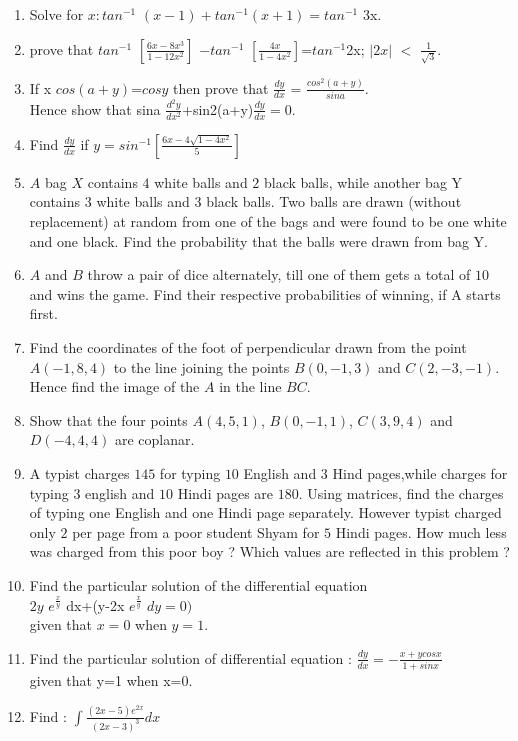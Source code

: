 \documentclass[12pt,-letter paper]{article}
\begin{document}
\begin{enumerate}
\item Solve for $x:tan^{-1}$ $(x-1)+tan^{-1}(x+1)=tan^{-1}$ 3x.
\item prove that $tan^{-1}$ $[\frac{6x-8x^3}{1-12x^2}]$
$-tan^{-1}$ $[\frac{4x}{1-4x^2}]$=$tan^{-1}$2x; $|2x|$ $<$ $\frac{1}{\sqrt{3}}.$
\item If x $cos(a+y)$=$cosy$ then prove that $\frac{dy}{dx}$ = $\frac{cos^2(a+y)}{sina}$. \\
	
Hence show that sina $\frac{d^2y}{dx^2}$+sin2(a+y)$\frac{dy}{dx}=0$.
\item Find $\frac{dy}{dx}$ if $y=sin^{-1}[\frac{6x-4\sqrt{1-4x^2}}{5}]$
\item $A$ bag $X$ contains $4$ white balls and $2$ black balls, while another bag Y contains $3$ white balls and
$3$ black balls. Two balls are drawn (without replacement) at random from one of the bags and were found to be one white and one black. Find the probability that the balls were drawn from bag Y.
\item $A$ and $B$ throw a pair of dice alternately, till one of them gets a total of $10$ and wins the  game. 
Find their respective probabilities of winning, if A starts first.
\item Find the coordinates of the foot of perpendicular
drawn from the point $A(-1,8,4)$ to the line joining the points $B(0,-1,3)$ and $C(2,-3,-1)$. Hence find the image of the $A$ in the line $BC$.
\item Show that the four points $A(4,5,1)$, $B(0,-1, 1)$, $C(3,9,4)$ and $D(-4,4,4)$ are coplanar.
\item A typist charges \rupee $145$ for typing $10$ English and $3$ Hind pages,while charges for typing $3$ english and $10$ Hindi pages are \rupee $180$. Using matrices, find the charges of typing one English and one Hindi page separately. However typist charged only \rupee $2$ per page from a poor student Shyam for $5$ Hindi pages. How much less was charged from this poor boy ? Which values are reflected in this problem ? 
\item Find the particular solution of the differential equation \\ $2y$ $e^{\frac{x}{y}}$ dx+(y-2x $e^{\frac{x}{y}}$ $dy=0)$ \\ given that $x=0$ when $y=1$.
\item Find the particular solution of differential equation : $\frac{dy}{dx}=-\frac{x+ycosx}{1+sinx}$ \\ given that y=1 when x=0.
\item Find : $\int\frac{(2x-5)e^{2x}}{(2x-3)^3}dx$

\end{enumerate}
\end{document}
